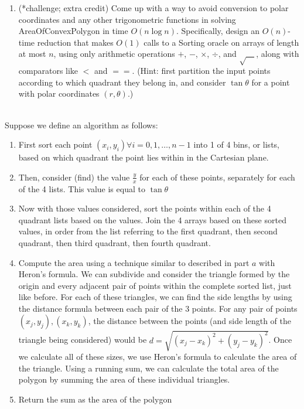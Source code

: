 \documentclass[11pt]{article}
\begin{document}
\begin{enumerate}
\begin{enumerate}
        \item (*challenge; extra credit) Come up with a way to avoid conversion to polar coordinates and any other trigonometric functions in solving AreaOfConvexPolygon in time $O(n\log n)$.  Specifically, design an $O(n)$-time reduction that makes $O(1)$ calls to a Sorting oracle on arrays of length at most $n$, using only arithmetic operations $+$, $-$, $\times$, $\div$, and $\sqrt{\hspace{1em}}$, along with comparators like $<$ and $==$.  (Hint: first partition the input points according to which quadrant they belong in, and consider $\tan\theta$ for a point with polar coordinates $(r,\theta)$.) \label{part:nopolar}
        \end{enumerate} \\
        
        Suppose we define an algorithm as follows: 
        \begin{enumerate}[i]
            \item First sort each point $(x_i, y_i) \forall i=0, 1, \dots, n-1$ into 1 of 4 bins, or lists, based on which quadrant the point lies within in the Cartesian plane.
            \item Then, consider (find) the value $\frac{y}{x}$ for each of these points, separately for each of the 4 lists. This value is equal to $\tan \theta$
            \item Now with those values considered, sort the points within each of the 4 quadrant lists based on the values. Join the 4 arrays based on these sorted values, in order from the list referring to the first quadrant, then second quadrant, then third quadrant, then fourth quadrant. 
            \item Compute the area using a technique similar to described in part $a$ with Heron's formula. We can subdivide and consider the triangle formed by the origin and every adjacent pair of points within the complete sorted list, just like before. For each of these triangles, we can find the side lengths by using the distance formula between each pair of the 3 points. For any pair of points $(x_j, y_j), (x_k, y_k)$, the distance between the points (and side length of the triangle being considered) would be $d = \sqrt{(x_j - x_k)^2 + (y_j - y_k)^2}$. Once we calculate all of these sizes, we use Heron's formula to calculate the area of the triangle. Using a running sum, we can calculate the total area of the polygon by summing the area of these individual triangles. 
            \item Return the sum as the area of the polygon
        \end{enumerate} \\
        

\end{enumerate}
\end{document}
